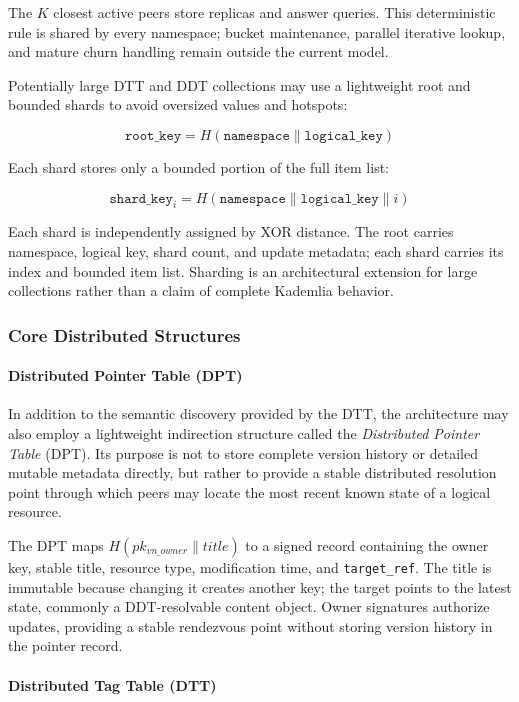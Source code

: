 \documentclass[12pt,a4paper]{article}
\begin{document}
The $K$ closest active peers store replicas and answer queries. This deterministic rule is shared by every namespace; bucket maintenance, parallel iterative lookup, and mature churn handling remain outside the current model.

Potentially large DTT and DDT collections may use a lightweight root and bounded shards to avoid oversized values and hotspots:

\[
\texttt{root\_key} = H(\texttt{namespace} \parallel \texttt{logical\_key})
\]

Each shard stores only a bounded portion of the full item list:

\[
\texttt{shard\_key}_i = H(\texttt{namespace} \parallel \texttt{logical\_key} \parallel i)
\]

Each shard is independently assigned by XOR distance. The root carries namespace, logical key, shard count, and update metadata; each shard carries its index and bounded item list. Sharding is an architectural extension for large collections rather than a claim of complete Kademlia behavior.


\subsubsection{Core Distributed Structures}

\paragraph{Distributed Pointer Table (DPT)}

In addition to the semantic discovery provided by the DTT, the architecture may also employ a lightweight indirection structure called the \textit{Distributed Pointer Table} (DPT). Its purpose is not to store complete version history or detailed mutable metadata directly, but rather to provide a stable distributed resolution point through which peers may locate the most recent known state of a logical resource.

The DPT maps $H(pk_{vn\_owner} \parallel title)$ to a signed record containing the owner key, stable title, resource type, modification time, and \texttt{target\_ref}. The title is immutable because changing it creates another key; the target points to the latest state, commonly a DDT-resolvable content object. Owner signatures authorize updates, providing a stable rendezvous point without storing version history in the pointer record.


\paragraph{Distributed Tag Table (DTT)}
\end{document}
